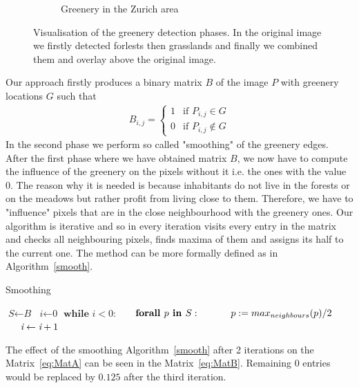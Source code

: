 \documentclass[letterpaper]{article}
\begin{document}
\begin{figure}[htb]
\begin{subfigure}[t]{.48\columnwidth}
        \caption[width=.9\linewidth]{Greenery in the Zurich area}
    \end{subfigure}
    \caption{Visualisation of the greenery detection phases. In the original image we firstly detected forlests then
             grasslands and finally we combined them and overlay above the original image.}
    \label{fig:ZurichGreenery}
\end{figure}

\indent Our approach firstly produces a binary matrix $B$ of the image $P$ with greenery locations $G$ such that
\newline
\begin{align*}
B_{i,j} = \begin{cases} 1 & \text{if } P_{i,j} \in G\\
                         0 & \text{if } P_{i,j} \notin G
\end{cases}
\end{align*}
\newline
In the second phase we perform so called "smoothing" of the greenery edges. After the first phase where we have obtained matrix $B$,
we now have to compute the influence of the greenery on the pixels without it i.e. the ones with the value 0. The reason why it is needed is
because inhabitants do not live in the forests or on the meadows but rather profit from living close to them. Therefore, we have
to "influence" pixels that are in the close neighbourhood with the greenery ones. Our algorithm is iterative and so in every iteration
visits every entry in the matrix and checks all neighbouring pixels, finds maxima of them and assigns its half to the current one.
The method can be more formally defined as in Algorithm~\ref{smooth}.

\begin{algorithm}
    \caption{Smoothing}\label{smooth}
    \begin{algorithmic}[1]
            \State $\textit{S} \gets \textit{B}$
            \State $\textit{i} \gets \textit{0}$
            \State $\textbf{while } \textit{i} < 0:$
            \State $\indent \textbf{forall } p \textbf{ in } S:$
            \State $\indent \indent p := max_{neighbours}(p) / 2$
            \State $\indent \textit{i} \gets \textit{i} + 1$
        \EndProcedure
    \end{algorithmic}
\end{algorithm}

The effect of the smoothing Algorithm~\ref{smooth} after 2 iterations on the Matrix~\ref{eq:MatA}
can be seen in the Matrix~\ref{eq:MatB}. Remaining $0$ entries would be replaced by $0.125$ after
the third iteration.
\end{document}
